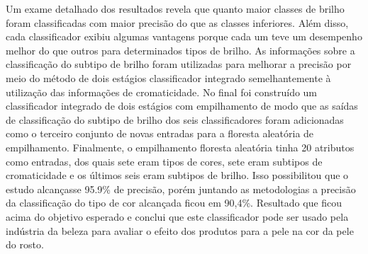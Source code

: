 \begin{table}[]
\centering
\caption{Tabela comparativa entre os métodos e precisões}
\label{table:Tabela_comparativa_entre_os_métodos_e_precisões}\textbf{}
\end{table}


Um exame detalhado dos resultados revela que quanto maior classes de brilho foram classificadas com maior precisão do que as classes inferiores. Além disso, cada classificador exibiu algumas vantagens porque cada um teve um desempenho melhor do que outros para determinados tipos de brilho. As informações sobre a classificação do subtipo de brilho foram utilizadas para melhorar a precisão por meio do método de dois estágios classificador integrado semelhantemente à utilização das informações de cromaticidade. No final foi construído um classificador integrado de dois estágios com empilhamento de modo que as saídas de classificação do subtipo de brilho dos seis classificadores foram adicionadas como o terceiro conjunto de novas entradas para a floresta aleatória de empilhamento. Finalmente, o empilhamento floresta aleatória tinha 20 atributos como entradas, dos quais sete eram tipos de cores, sete eram subtipos de cromaticidade e os últimos seis eram subtipos de brilho.
Isso possibilitou que o estudo alcançasse 95.9\% de precisão, porém juntando as metodologias a precisão da classificação do tipo de cor alcançada ficou em 90,4\%. Resultado que ficou acima do objetivo esperado e conclui que este classificador pode ser usado pela indústria da beleza para avaliar o efeito dos produtos para a pele na cor da pele do rosto.


